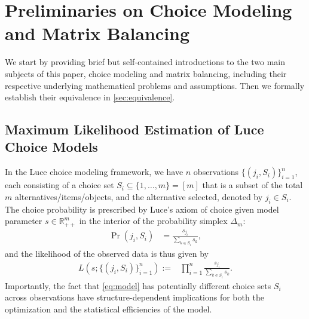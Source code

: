 \section{Preliminaries on Choice Modeling and Matrix Balancing}
\label{sec:formulations}
We start by providing brief but self-contained introductions to the two main subjects of this paper,
choice modeling and matrix balancing, including their respective underlying mathematical problems and assumptions. Then we formally establish their equivalence in \cref{sec:equivalence}.
\subsection{Maximum Likelihood Estimation of Luce Choice Models}
\label{subsec:Luce}
In the Luce choice modeling framework, we have $n$ observations $\{(j_i,S_i)\}_{i=1}^n$, each consisting of a choice set $S_{i}\subseteq \{1,\dots,m\}=[m]$ that is a subset
of the total $m$ alternatives/items/objects, and the alternative selected, denoted by $j_i \in S_i$.
 The choice probability is prescribed by Luce's axiom of choice given model parameter $s\in\mathbb{R}^m_{++}$
 in the interior of the probability simplex $\Delta_m$:
\begin{align*}
\Pr(j_i, S_i) & =\frac{s_{j_i}}{\sum_{k\in S_{i}}s_{k}},
\end{align*}
and the likelihood of the observed data is thus given by 
\begin{align}
\label{eq:model}
L(s;\{(j_i,S_i)\}_{i=1}^n):=& \prod_{i=1}^{n}\frac{s_{j_i}}{\sum_{k\in S_{i}}s_{k}}.
\end{align} 
 Importantly, the fact that \eqref{eq:model} has potentially different choice sets $S_i$ across observations have   structure-dependent implications for both the optimization and the statistical efficiencies of the model.

